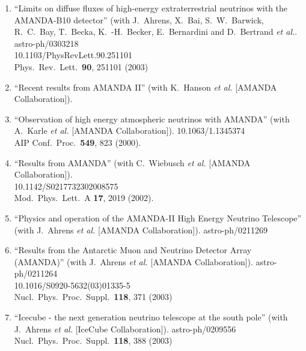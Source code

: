 \begin{enumerate}
\item ``Limits on diffuse fluxes of high-energy extraterrestrial neutrinos
  with the AMANDA-B10 detector'' (with J.~Ahrens, X.~Bai, S.~W.~Barwick,
  R.~C.~Bay, T.~Becka, K.~-H.~Becker, E.~Bernardini and D.~Bertrand
  {\it et al.}.  \\{}astro-ph/0303218
  \\{}10.1103/PhysRevLett.90.251101 \\{}Phys.\ Rev.\ Lett.\ {\bf 90},
  251101 (2003) %


\item ``Recent results from AMANDA II'' (with K.~Hanson {\it et al.}  [AMANDA
  Collaboration]).
  


\item ``Observation of high energy atmospheric neutrinos with AMANDA'' (with A.~Karle {\it et al.}  [AMANDA Collaboration]). 10.1063/1.1345374 \\{}AIP Conf.\ Proc.\ {\bf 549}, 823
  (2000). %


\item ``Results from AMANDA'' (with C.~Wiebusch {\it et al.}  [AMANDA
  Collaboration]).  \\{}10.1142/S0217732302008575
  \\{}Mod.\ Phys.\ Lett.\ A {\bf 17}, 2019 (2002). %


\item ``Physics and operation of the AMANDA-II High Energy Neutrino
  Telescope'' (with J.~Ahrens {\it et al.}  [AMANDA Collaboration]). astro-ph/0211269
  


\item ``Results from the Antarctic Muon and Neutrino Detector Array (AMANDA)'' (with J.~Ahrens {\it et al.}  [AMANDA Collaboration]). astro-ph/0211264
    \\{}10.1016/S0920-5632(03)01335-5
\\{}Nucl.\ Phys.\ Proc.\ Suppl.\  {\bf 118}, 371 (2003) %


\item ``Icecube - the next generation neutrino telescope at the south pole'' (with J.~Ahrens {\it et al.}  [IceCube Collaboration]). astro-ph/0209556
\\{}Nucl.\ Phys.\ Proc.\ Suppl.\  {\bf 118}, 388 (2003) %



\end{enumerate}
